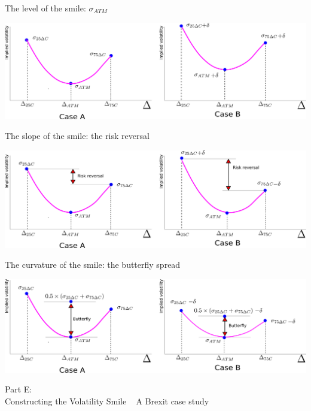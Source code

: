 \documentclass[ignorenonframetext,aspectratio=169]{beamer}
\begin{document}
\begin{frame}{The level of the smile: \(\sigma_{ATM}\)}

\includegraphics[width=1\linewidth]{images/figRRLevel}

\end{frame}

\begin{frame}{The slope of the smile: the risk reversal}

\includegraphics[width=1\linewidth]{images/figRRSlope}

\end{frame}

\begin{frame}{The curvature of the smile: the butterfly spread}

\includegraphics[width=1\linewidth]{images/figRRCurvature}

\end{frame}

\begin{frame}{}

\color{blue} \LARGE{Part E:}\\
\LARGE{Constructing the Volatility Smile} ~ \Large{A Brexit case study}

\end{frame}
\end{document}
